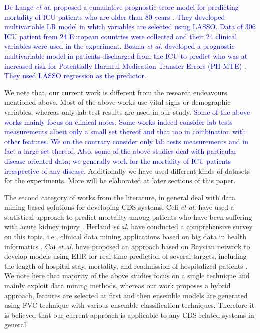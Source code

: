 \textcolor{blue}{De Lange \textit{et al.} proposed a cumulative prognostic score model for predicting mortality of ICU patients who are older than 80 years \cite{Lange2019}. They developed multivariable LR model in which variables are selected using LASSO. Data of 306 ICU patient from 24 European countries were collected and their 24 clinical variables were used in the experiment. Bosma \textit{et al.} developed a prognostic multivariable model in patients discharged from the ICU to predict who was at increased risk for Potentially Harmful Medication Transfer Errors (PH-MTE) \cite{Bosma2019}. They used LASSO regression as the predictor.}

We note that, our current work is different from the research endeavours mentioned above. Most of the above works use vital signs or demographic variables, whereas only lab test results are used in our study. \textcolor{blue}{Some of the above works mainly focus on clinical notes. Some works indeed consider lab tests measurements albeit only a small set thereof and that too in combination with other features. We on the contrary consider only lab tests measurements and in fact a large set thereof. Also, some of the above studies deal with particular disease oriented data; we generally work for the mortality of ICU patients irrespective of any disease.} Additionally we have used different kinds of datasets for the experiments. More will be elaborated at later sections of this paper.

The second category of works from the literature, in general deal with data mining based solutions for developing CDS systems. Celi \textit{et al.} have used a statistical approach to predict mortality among patients who have been suffering with acute kidney injury \cite{Celi}. Herland \textit{et al.} have conducted a comprehensive survey on this topic, i.e., clinical data mining applications based on big data in health informatics \cite{Herland}. Cai \textit{et al.} have proposed an approach based on Baysian network to develop models using EHR for real time prediction of several targets, including the length of hospital stay, mortality, and readmission of hospitalized patients \cite{Cai:2016}. We note here that majority of the above studies focus on a single technique and mainly exploit data mining methods, whereas our work proposes a hybrid approach, features are selected at first and then ensemble models are generated using FVC technique with various ensemble classification techniques. Therefore it is believed that our current approach is applicable to any CDS related systems in general. 

